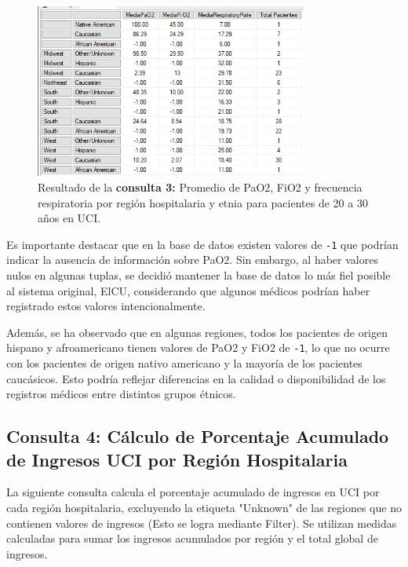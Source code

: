 \documentclass[12pt, a4paper, twoside]{article}
\begin{document}
	\begin{figure}[H]
		\centering
		\includegraphics[width=0.8\textwidth]{image/consulta3.png}
		\caption{Resultado de la  \textbf{consulta 3:} Promedio de PaO2, FiO2 y frecuencia respiratoria por región hospitalaria y etnia para pacientes de 20 a 30 años en UCI.}
		\label{fig:consulta3}
	\end{figure}
	
	Es importante destacar que en la base de datos existen valores de \texttt{-1} que podrían indicar la ausencia de información sobre PaO2. Sin embargo, al haber valores nulos en algunas tuplas, se decidió mantener la base de datos lo más fiel posible al sistema original, ElCU, considerando que algunos médicos podrían haber registrado estos valores intencionalmente.
	
	Además, se ha observado que en algunas regiones, todos los pacientes de origen hispano y afroamericano tienen valores de PaO2 y FiO2 de \texttt{-1}, lo que no ocurre con los pacientes de origen nativo americano y la mayoría de los pacientes caucásicos. Esto podría reflejar diferencias en la calidad o disponibilidad de los registros médicos entre distintos grupos étnicos.
	
	\subsection{Consulta 4: Cálculo de Porcentaje Acumulado de Ingresos UCI por Región Hospitalaria}
	
	La siguiente consulta calcula el porcentaje acumulado de ingresos en UCI por cada región hospitalaria, excluyendo la etiqueta "Unknown" de las regiones que no contienen valores de ingresos (Esto se logra mediante Filter). Se utilizan medidas calculadas para sumar los ingresos acumulados por región y el total global de ingresos.
	
\end{document}
